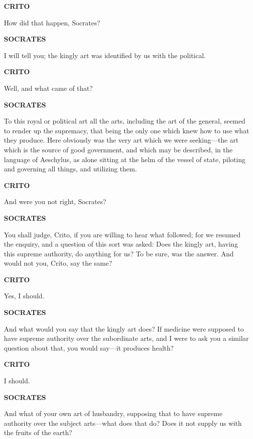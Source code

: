 \documentclass[11pt,letter]{article}
\begin{document}
\par \textbf{CRITO}
\par   How did that happen, Socrates?

\par \textbf{SOCRATES}
\par   I will tell you; the kingly art was identified by us with the political.

\par \textbf{CRITO}
\par   Well, and what came of that?

\par \textbf{SOCRATES}
\par   To this royal or political art all the arts, including the art of the general, seemed to render up the supremacy, that being the only one which knew how to use what they produce. Here obviously was the very art which we were seeking—the art which is the source of good government, and which may be described, in the language of Aeschylus, as alone sitting at the helm of the vessel of state, piloting and governing all things, and utilizing them.

\par \textbf{CRITO}
\par   And were you not right, Socrates?

\par \textbf{SOCRATES}
\par   You shall judge, Crito, if you are willing to hear what followed; for we resumed the enquiry, and a question of this sort was asked:  Does the kingly art, having this supreme authority, do anything for us? To be sure, was the answer. And would not you, Crito, say the same?

\par \textbf{CRITO}
\par   Yes, I should.

\par \textbf{SOCRATES}
\par   And what would you say that the kingly art does? If medicine were supposed to have supreme authority over the subordinate arts, and I were to ask you a similar question about that, you would say—it produces health?

\par \textbf{CRITO}
\par   I should.

\par \textbf{SOCRATES}
\par   And what of your own art of husbandry, supposing that to have supreme authority over the subject arts—what does that do? Does it not supply us with the fruits of the earth?
\end{document}
